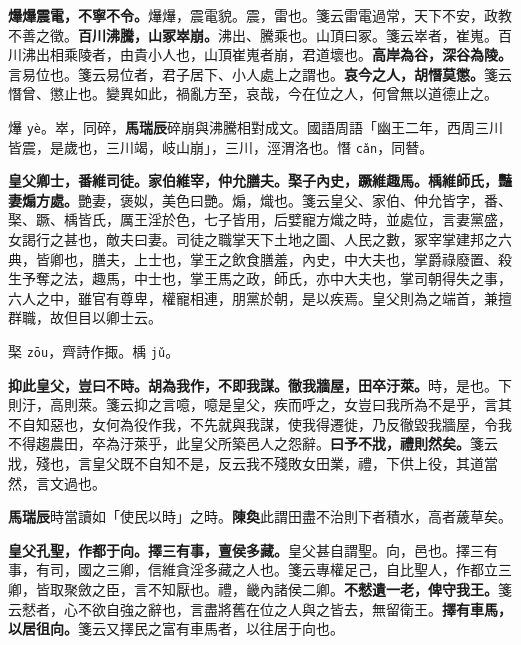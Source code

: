 \textbf{爗爗震電，不寧不令。}{\footnotesize 爗爗，震電貌。震，雷也。箋云雷電過常，天下不安，政教不善之徵。}\textbf{百川沸騰，山冢崒崩。}{\footnotesize 沸出、騰乘也。山頂曰冢。箋云崒者，崔嵬。百川沸出相乘陵者，由貴小人也，山頂崔嵬者崩，君道壞也。}\textbf{高岸為谷，深谷為陵。}{\footnotesize 言易位也。箋云易位者，君子居下、小人處上之謂也。}\textbf{哀今之人，胡憯莫懲。}{\footnotesize 箋云憯曾、懲止也。變異如此，禍亂方至，哀哉，今在位之人，何曾無以道德止之。}

\begin{quoting}爗 \texttt{yè}。崒，同碎，\textbf{馬瑞辰}碎崩與沸騰相對成文。國語周語「幽王二年，西周三川皆震，是歲也，三川竭，岐山崩」，三川，涇渭洛也。憯 \texttt{cǎn}，同朁。\end{quoting}

\textbf{皇父卿士，番維司徒。家伯維宰，仲允膳夫。棸子內史，蹶維趣馬。楀維師氏，豔妻煽方處。}{\footnotesize 艷妻，褒姒，美色曰艷。煽，熾也。箋云皇父、家伯、仲允皆字，番、棸、蹶、楀皆氏，厲王淫於色，七子皆用，后嬖寵方熾之時，並處位，言妻黨盛，女謁行之甚也，敵夫曰妻。司徒之職掌天下土地之圖、人民之數，冢宰掌建邦之六典，皆卿也，膳夫，上士也，掌王之飲食膳羞，內史，中大夫也，掌爵祿廢置、殺生予奪之法，趣馬，中士也，掌王馬之政，師氏，亦中大夫也，掌司朝得失之事，六人之中，雖官有尊卑，權寵相連，朋黨於朝，是以疾焉。皇父則為之端首，兼擅群職，故但目以卿士云。}

\begin{quoting}棸 \texttt{zōu}，齊詩作掫。楀 \texttt{jǔ}。\end{quoting}

\textbf{抑此皇父，豈曰不時。胡為我作，不即我謀。徹我牆屋，田卒汙萊。}{\footnotesize 時，是也。下則汙，高則萊。箋云抑之言噫，噫是皇父，疾而呼之，女豈曰我所為不是乎，言其不自知惡也，女何為役作我，不先就與我謀，使我得遷徙，乃反徹毀我牆屋，令我不得趨農田，卒為汙萊乎，此皇父所築邑人之怨辭。}\textbf{曰予不戕，禮則然矣。}{\footnotesize 箋云戕，殘也，言皇父既不自知不是，反云我不殘敗女田業，禮，下供上役，其道當然，言文過也。}

\begin{quoting}\textbf{馬瑞辰}時當讀如「使民以時」之時。\textbf{陳奐}此謂田盡不治則下者積水，高者薉草矣。\end{quoting}

\textbf{皇父孔聖，作都于向。擇三有事，亶侯多藏。}{\footnotesize 皇父甚自謂聖。向，邑也。擇三有事，有司，國之三卿，信維貪淫多藏之人也。箋云專權足己，自比聖人，作都立三卿，皆取聚斂之臣，言不知厭也。禮，畿內諸侯二卿。}\textbf{不憖遺一老，俾守我王。}{\footnotesize 箋云憖者，心不欲自強之辭也，言盡將舊在位之人與之皆去，無留衛王。}\textbf{擇有車馬，以居徂向。}{\footnotesize 箋云又擇民之富有車馬者，以往居于向也。}

